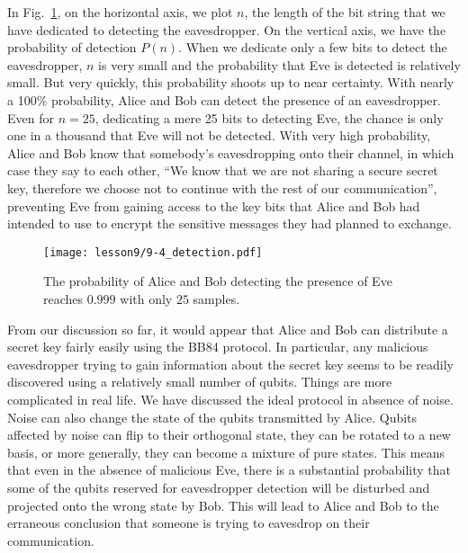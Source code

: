 In Fig.~\ref{fig:catching-eve}, on the horizontal axis, we plot $n$, the length of the bit string that we have dedicated to detecting the eavesdropper.
On the vertical axis, we have the probability of detection $P(n)$.
When we dedicate only a few bits to detect the eavesdropper, $n$ is very small and the probability that Eve is detected is relatively small.
But very quickly, this probability shoots up to near certainty.
With nearly a 100\% probability, Alice and Bob can detect the presence of an eavesdropper.
Even for $n = 25$, dedicating a mere 25 bits to detecting Eve, the chance is only one in a thousand that Eve will not be detected.
With very high probability, Alice and Bob know that somebody's eavesdropping onto their channel, in which case they say to each other, ``We know that we are not sharing a secure secret key, therefore we choose not to continue with the rest of our communication'', preventing Eve from gaining access to the key bits that Alice and Bob had intended to use to encrypt the sensitive messages they had planned to exchange.

\begin{figure}[t]
    \centering
    \texttt{[image: lesson9/9-4\_detection.pdf]}
        \caption[Probability of detecting the presence of Eve.]{The probability of Alice and Bob detecting the presence of Eve reaches $0.999$ with only $25$ samples.}
    \label{fig:catching-eve}
\end{figure}

From our discussion so far, it would appear that Alice and Bob can distribute a secret key fairly easily using the BB84 protocol.
In particular, any malicious eavesdropper trying to gain information about the secret key seems to be readily discovered using a relatively small number of qubits.
Things are more complicated in real life.
We have discussed the ideal protocol in absence of noise.
Noise can also change the state of the qubits transmitted by Alice.
Qubits affected by noise can flip to their orthogonal state, they can be rotated to a new basis, or more generally, they can become a mixture of pure states.
This means that even in the absence of malicious Eve, there is a substantial probability that some of the qubits reserved for eavesdropper detection will be disturbed and projected onto the wrong state by Bob.
This will lead to Alice and Bob to the erraneous conclusion that someone is trying to eavesdrop on their communication.

